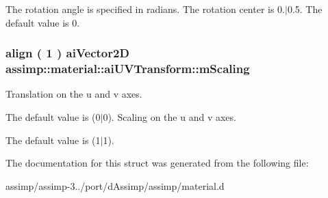 The rotation angle is specified in radians. The rotation center is 0.$\vert$0.5. The default value is 0. \hypertarget{structassimp_1_1material_1_1ai_u_v_transform_a402c62fd99c783a4acd78a37e9de7700}{
\subsubsection[{m\+Scaling}]{\setlength{\rightskip}{0pt plus 5cm}align ( 1 ) {\bf ai\+Vector2\+D} assimp\+::material\+::ai\+U\+V\+Transform\+::m\+Scaling}}\label{structassimp_1_1material_1_1ai_u_v_transform_a402c62fd99c783a4acd78a37e9de7700}
Translation on the u and v axes.

The default value is (0$\vert$0). Scaling on the u and v axes.

The default value is (1$\vert$1). 

The documentation for this struct was generated from the following file\+:\begin{DoxyCompactItemize}
\item 
assimp/assimp-\/3../port/d\+Assimp/assimp/material.\+d\end{DoxyCompactItemize}
